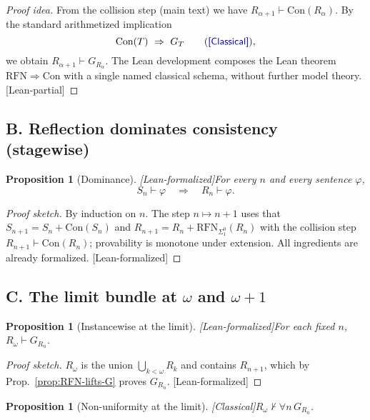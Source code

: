 \documentclass[11pt]{article}
\newtheorem{proposition}[theorem]{Proposition}
\newcommand{\Con}{\mathrm{Con}}
\newcommand{\RFN}{\mathrm{RFN}}
\newcommand{\RFNSigOne}{\mathrm{RFN}_{\Sigma^0_1}}
\newcommand{\leanok}{\textsf{\textcolor{green!70!black}{[Lean-formalized]}}}
\newcommand{\leancited}{\textsf{\textcolor{blue!70!black}{[Classical]}}}
\newcommand{\leanpartial}{\textsf{\textcolor{violet!70!black}{[Lean-partial]}}}
\begin{document}
\begin{proof}[Proof idea]
From the collision step (main text) we have
$R_{\alpha+1}\vdash \Con(R_\alpha)$.
By the standard arithmetized implication
\[
  \Con(T)\ \Rightarrow\ G_T \qquad(\leancited),
\]
we obtain $R_{\alpha+1}\vdash G_{R_\alpha}$. The Lean development composes
the Lean theorem $\RFN\Rightarrow\Con$ with a single named classical schema,
without further model theory. \leanpartial
\end{proof}

\subsection{B. Reflection dominates consistency (stagewise)} 

\begin{proposition}[Dominance]\label{prop:dominance}
\leanok\quad For every $n$ and every sentence $\varphi$,
\[
  S_n \vdash \varphi \quad\Longrightarrow\quad R_n \vdash \varphi .
\]
\end{proposition}

\begin{proof}[Proof sketch]
By induction on $n$. The step $n\mapsto n{+}1$ uses that
$S_{n+1}=S_n+\Con(S_n)$ and $R_{n+1}=R_n+\RFNSigOne(R_n)$ with the collision
step $R_{n+1}\vdash \Con(R_n)$; provability is monotone under extension.
All ingredients are already formalized. \leanok
\end{proof}

\subsection{C. The limit bundle at $\omega$ and $\omega{+}1$}

\begin{proposition}[Instancewise at the limit]\label{prop:limit-instance} 
\leanok\quad For each fixed $n$, $R_\omega \vdash G_{R_n}$.
\end{proposition}

\begin{proof}[Proof sketch]
$R_\omega$ is the union $\bigcup_{k<\omega} R_k$ and contains $R_{n+1}$,
which by Prop.~\ref{prop:RFN-lifts-G} proves $G_{R_n}$. \leanok
\end{proof}

\begin{proposition}[Non-uniformity at the limit]\label{prop:limit-nonuniform} 
\leancited\quad $R_\omega \nvdash \forall n\,G_{R_n}$.
\end{proposition}
\end{document}
